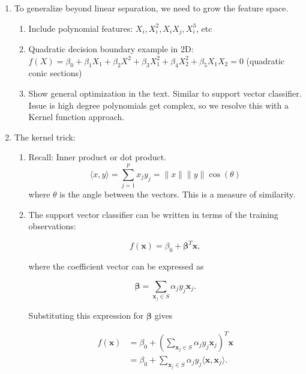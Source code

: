 \documentclass{article}
\begin{document}
\begin{enumerate}
\item To generalize beyond linear separation, we need to grow the feature space.
\begin{enumerate}
\item Include polynomial features: $X_i, X_i^2, X_i X_j, X_i^3$, etc
\item Quadratic decision boundary example in 2D: $f(X) = \beta_0+\beta_1X_1 + \beta_2 X^2 + \beta_3 X_1^2 + \beta_4 X_2^2 + \beta_5 X_1 X_2 = 0$ (quadratic conic sections)
\item Show general optimization in the text. Similar to support vector classifier. Issue is high degree polynomials get complex, so we resolve this with a Kernel function approach. 
\end{enumerate}

\item The kernel trick:
\begin{enumerate}
\item Recall: Inner product or dot product. 
\[
\langle x, y \rangle = \sum_{j=1}^p x_{j} y_{j} = \|  x \| \| y \| \cos(\theta)
\]
where $\theta$ is the angle between the vectors. This is a measure of similarity.
\item The support vector classifier can be written in terms of the training observations:

\[
f(\mathbf{x}) = \beta_0 + \boldsymbol{\beta}^T\mathbf{x},
\]

where the coefficient vector can be expressed as

\[
\boldsymbol{\beta} =
\sum_{\mathbf{x}_j \in S} \alpha_j y_j \mathbf{x}_j.
\]

Substituting this expression for $\boldsymbol{\beta}$ gives

\[
\begin{aligned}
f(\mathbf{x})
&= \beta_0 +
\left(\sum_{\mathbf{x}_j \in S}
\alpha_j y_j \mathbf{x}_j\right)^T\mathbf{x}\\
&= \beta_0 +
\sum_{\mathbf{x}_j \in S}
\alpha_j y_j \langle \mathbf{x},\mathbf{x}_j\rangle.
\end{aligned}
\]


\end{enumerate}
\end{enumerate}
\end{document}
